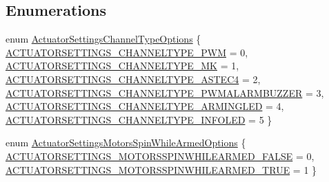 \subsection*{\-Enumerations}
\begin{DoxyCompactItemize}
\item 
enum \hyperlink{group___actuator_settings_ga61522eb2a5380fef694eb5e5303b178a}{\-Actuator\-Settings\-Channel\-Type\-Options} \{ \*
\hyperlink{group___actuator_settings_gga61522eb2a5380fef694eb5e5303b178aaee516c8e599abad4e8cc474a3a3d64c1}{\-A\-C\-T\-U\-A\-T\-O\-R\-S\-E\-T\-T\-I\-N\-G\-S\-\_\-\-C\-H\-A\-N\-N\-E\-L\-T\-Y\-P\-E\-\_\-\-P\-W\-M} = 0, 
\hyperlink{group___actuator_settings_gga61522eb2a5380fef694eb5e5303b178aab0f8f464d752a0ca4af7c79c8632b1f3}{\-A\-C\-T\-U\-A\-T\-O\-R\-S\-E\-T\-T\-I\-N\-G\-S\-\_\-\-C\-H\-A\-N\-N\-E\-L\-T\-Y\-P\-E\-\_\-\-M\-K} = 1, 
\hyperlink{group___actuator_settings_gga61522eb2a5380fef694eb5e5303b178aae2074bcb6ffbc9bc55d97eee4a030151}{\-A\-C\-T\-U\-A\-T\-O\-R\-S\-E\-T\-T\-I\-N\-G\-S\-\_\-\-C\-H\-A\-N\-N\-E\-L\-T\-Y\-P\-E\-\_\-\-A\-S\-T\-E\-C4} = 2, 
\hyperlink{group___actuator_settings_gga61522eb2a5380fef694eb5e5303b178aa7e9409b1d2abccfb1f2334b93943ac38}{\-A\-C\-T\-U\-A\-T\-O\-R\-S\-E\-T\-T\-I\-N\-G\-S\-\_\-\-C\-H\-A\-N\-N\-E\-L\-T\-Y\-P\-E\-\_\-\-P\-W\-M\-A\-L\-A\-R\-M\-B\-U\-Z\-Z\-E\-R} = 3, 
\*
\hyperlink{group___actuator_settings_gga61522eb2a5380fef694eb5e5303b178aaff27424ede90fd2084c003b6f91d2dd9}{\-A\-C\-T\-U\-A\-T\-O\-R\-S\-E\-T\-T\-I\-N\-G\-S\-\_\-\-C\-H\-A\-N\-N\-E\-L\-T\-Y\-P\-E\-\_\-\-A\-R\-M\-I\-N\-G\-L\-E\-D} = 4, 
\hyperlink{group___actuator_settings_gga61522eb2a5380fef694eb5e5303b178aae6446b557b0e2d3639c4af99c9d77e66}{\-A\-C\-T\-U\-A\-T\-O\-R\-S\-E\-T\-T\-I\-N\-G\-S\-\_\-\-C\-H\-A\-N\-N\-E\-L\-T\-Y\-P\-E\-\_\-\-I\-N\-F\-O\-L\-E\-D} = 5
 \}
\item 
enum \hyperlink{group___actuator_settings_ga5a2a953a1b818ced8a334d0c82d04015}{\-Actuator\-Settings\-Motors\-Spin\-While\-Armed\-Options} \{ \hyperlink{group___actuator_settings_gga5a2a953a1b818ced8a334d0c82d04015aa1b53693e824c4f7fcb343e40458498b}{\-A\-C\-T\-U\-A\-T\-O\-R\-S\-E\-T\-T\-I\-N\-G\-S\-\_\-\-M\-O\-T\-O\-R\-S\-S\-P\-I\-N\-W\-H\-I\-L\-E\-A\-R\-M\-E\-D\-\_\-\-F\-A\-L\-S\-E} = 0, 
\hyperlink{group___actuator_settings_gga5a2a953a1b818ced8a334d0c82d04015a2ed4331eaf05fa2fa76781327f0017b0}{\-A\-C\-T\-U\-A\-T\-O\-R\-S\-E\-T\-T\-I\-N\-G\-S\-\_\-\-M\-O\-T\-O\-R\-S\-S\-P\-I\-N\-W\-H\-I\-L\-E\-A\-R\-M\-E\-D\-\_\-\-T\-R\-U\-E} = 1
 \}
\end{DoxyCompactItemize}
